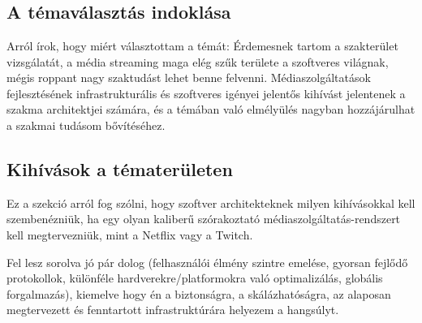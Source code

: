 \chapter{\bevezetes}

\section{A témaválasztás indoklása}

Arról írok, hogy miért választottam a témát: Érdemesnek tartom a szakterület vizsgálatát, a média streaming maga elég szűk területe a szoftveres világnak, mégis roppant nagy szaktudást lehet benne felvenni. Médiaszolgáltatások fejlesztésének infrastrukturális és szoftveres igényei jelentős kihívást jelentenek a szakma architektjei számára, és a témában való elmélyülés nagyban hozzájárulhat a szakmai tudásom bővítéséhez.

\section{Kihívások a tématerületen}

Ez a szekció arról fog szólni, hogy szoftver architekteknek milyen kihívásokkal kell szembenézniük, ha egy olyan kaliberű szórakoztató médiaszolgáltatás-rendszert kell megtervezniük, mint a Netflix vagy a Twitch. 

Fel lesz sorolva jó pár dolog (felhasználói élmény szintre emelése, gyorsan fejlődő protokollok, különféle hardverekre/platformokra való optimalizálás, globális forgalmazás), kiemelve hogy én a biztonságra, a skálázhatóságra, az alaposan megtervezett és fenntartott infrastruktúrára helyezem a hangsúlyt. 

